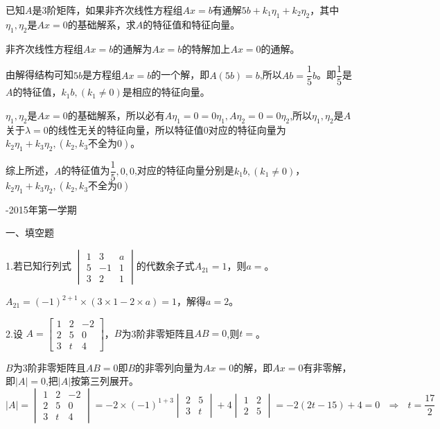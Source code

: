\documentclass{article}
\begin{document}
已知$A$是3阶矩阵，如果非齐次线性方程组$Ax=b$有通解$5b+k_1\eta_1+k_2\eta_2$，其中$\eta_1,\eta_2$是$Ax=0$的基础解系，求$A$的特征值和特征向量。

\begin{jie}
\textcolor[rgb]{1.00,0.00,0.00}{非齐次线性方程组$Ax=b$的通解为$Ax=b$的特解加上$Ax=0$的通解。}

由解得结构可知$5b$是方程组$Ax=b$的一个解，即$A(5b)=b$,所以$Ab=\dfrac{1}{5}b$。即$\dfrac{1}{5}$是$A$的特征值，$k_1b,(k_1\neq 0)$是相应的特征向量。

$\eta_1,\eta_2$是$Ax=0$的基础解系，所以必有$A\eta_1=0=0\eta_1,A\eta_{2}=0=0\eta_2$,所以$\eta_1,\eta_2$是$A$关于$\lambda=0$的线性无关的特征向量，所以特征值$0$对应的特征向量为$k_2\eta_1+k_3\eta_2,(k_2,k_3\text{不全为}0)$。

综上所述，$A$的特征值为$\dfrac{1}{5},0,0$,对应的特征向量分别是$k_1b,(k_1\neq 0)$，$k_2\eta_1+k_3\eta_2,(k_2,k_3\text{不全为}0)$
\end{jie}
\newpage
\hphantom{~~}\hfill {-2015年第一学期} \hfill\hphantom{~~}

一、填空题

1.若已知行列式
$
\begin{vmatrix}
  1 & 3 & a \\
  5 & -1 &1\\
  3 & 2&1
\end{vmatrix}
$的代数余子式$A_{21}=1$，则$a=$\underline{\hphantom{~~~~~~~~~~}}。

\begin{jie}
$A_{21}=(-1)^{2+1}\times(3\times 1-2\times a)=1$，解得$a=2$。
\end{jie}

2.设
$
A=
\begin{bmatrix}
  1 & 2 & -2 \\
  2 & 5 &0\\
  3 & t&4
\end{bmatrix}
$，$B$为3阶非零矩阵且$AB=0$,则$t=$\underline{\hphantom{~~~~~~~~~~}}。

\begin{jie}
$B$为3阶非零矩阵且$AB=0$即$B$的非零列向量为$Ax=0$的解，即$Ax=0$有非零解，即$|A|=0$,把$|A|$按第三列展开。
\begin{equation*}
  |A|=
  \begin{vmatrix}
  1 & 2 & -2 \\
  2 & 5 &0\\
  3 & t&4
  \end{vmatrix}=-2\times(-1)^{1+3}
  \begin{vmatrix}
  2 & 5 \\
  3 & t
  \end{vmatrix}+4
  \begin{vmatrix}
  1 & 2  \\
  2 & 5
  \end{vmatrix}=-2(2t-15)+4=0~~~\Rightarrow~~~t=\frac{17}{2}
\end{equation*}
\end{jie}
\end{document}
